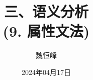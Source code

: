 \documentclass[]{beamer}
\title[语义分析]{三、语义分析 \\ (9. 属性文法)}
\author[魏恒峰]{\large 魏恒峰}
\institute{hfwei@nju.edu.cn}
\date{2024年04月17日}
\begin{document}
\maketitle




\thankyou{}

\end{document}
